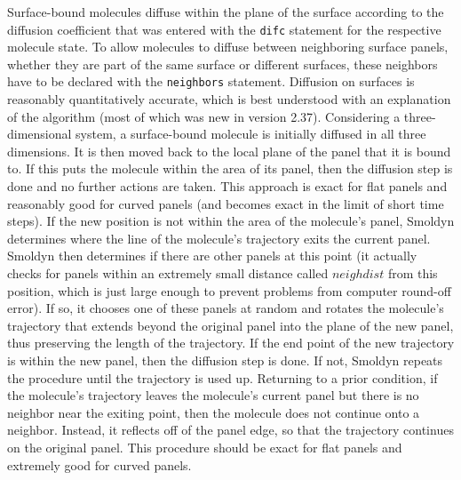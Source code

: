 \documentclass {book}
\newcommand {\ttt} {\texttt}
\begin{document}
Surface-bound molecules diffuse within the plane of the surface according to the diffusion coefficient that was entered with the \ttt{difc} statement for the respective molecule state. To allow molecules to diffuse between neighboring surface panels, whether they are part of the same surface or different surfaces, these neighbors have to be declared with the \ttt{neighbors} statement. Diffusion on surfaces is reasonably quantitatively accurate, which is best understood with an explanation of the algorithm (most of which was new in version 2.37). Considering a three-dimensional system, a surface-bound molecule is initially diffused in all three dimensions. It is then moved back to the local plane of the panel that it is bound to. If this puts the molecule within the area of its panel, then the diffusion step is done and no further actions are taken. This approach is exact for flat panels and reasonably good for curved panels (and becomes exact in the limit of short time steps). If the new position is not within the area of the molecule's panel, Smoldyn determines where the line of the molecule's trajectory exits the current panel. Smoldyn then determines if there are other panels at this point (it actually checks for panels within an extremely small distance called $neighdist$ from this position, which is just large enough to prevent problems from computer round-off error). If so, it chooses one of these panels at random and rotates the molecule's trajectory that extends beyond the original panel into the plane of the new panel, thus preserving the length of the trajectory. If the end point of the new trajectory is within the new panel, then the diffusion step is done. If not, Smoldyn repeats the procedure until the trajectory is used up. Returning to a prior condition, if the molecule's trajectory leaves the molecule's current panel but there is no neighbor near the exiting point, then the molecule does not continue onto a neighbor. Instead, it reflects off of the panel edge, so that the trajectory continues on the original panel. This procedure should be exact for flat panels and extremely good for curved panels.
\end{document}
